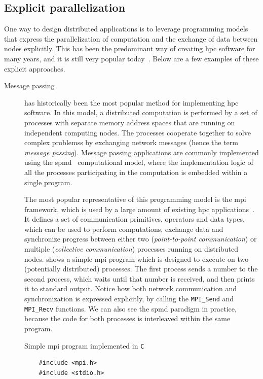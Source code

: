 \subsection*{Explicit parallelization}
One way to design distributed applications is to leverage programming models that express the
parallelization of computation and the exchange of data between nodes explicitly. This has been the
predominant way of creating \gls{hpc} software for many years, and it is still
very popular today~\cite{mpiusagestudy1,mpiusagestudy2,mpiusagestudy3}. Below are a few examples of these explicit
approaches.

\begin{description}
	\item[Message passing] has historically been the most popular method for implementing \gls{hpc} software.
		In this model, a distributed computation is performed by a set of processes with separate memory
		address spaces that are running on independent computing nodes. The processes cooperate together to
		solve complex problemss by exchanging network messages (hence the term \emph{message passing}).
		Message passing applications are commonly implemented using the
		\gls{spmd}~\cite{spmd} computational model, where the implementation
		logic of all the processes participating in the computation is embedded within a single program.

		The most popular representative of this programming model is the
		\gls{mpi}~\cite{mpi} framework, which is used by a large amount of
		existing \gls{hpc} applications~\cite{mpiusagestudy2}. It defines a set of
		communication primitives, operators and data types, which can be used to perform computations,
		exchange data and synchronize progress between either two (\emph{point-to-point communication}) or multiple
		(\emph{collective communication}) processes running on distributed nodes. 
		shows a simple \gls{mpi} program which is designed to execute on two (potentially
		distributed) processes. The first process sends a number to the second process, which waits until
		that number is received, and then prints it to standard output. Notice how both network
		communication and synchronization is expressed explicitly, by calling the
		\texttt{MPI\_Send} and \texttt{MPI\_Recv} functions. We can also see the
		\gls{spmd} paradigm in practice, because the code for both processes is interleaved
		within the same program.

		\begin{listing}[h]
			\caption{Simple \gls{mpi} program implemented in \texttt{C}}
			\label{lst:mpi-example}
			\begin{verbatim}
	#include <mpi.h>
	#include <stdio.h>


\end{verbatim}
\end{listing}
\end{description}
